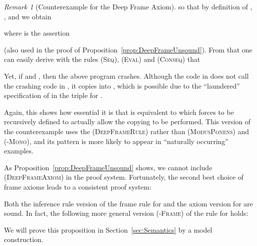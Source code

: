 \documentclass{LMCS}
\theoremstyle{remark}
\newtheorem{remark}[theorem]{Remark}
\begin{document}
\begin{remark}[Counterexample for the Deep Frame Axiom]
so that by definition of  , , and  we obtain

where  is the assertion 

(also used in the proof of Proposition~\ref{prop:DeepFrameUnsound}).
From that  one can easily derive with the rules  \textsc{(Seq)}, \textsc{(Eval)} and \textsc{(Conseq)}  that
  
Yet, if 
and , then the above program crashes. 
Although the code in  does not call the crashing code 
 in , it copies  
into , which is possible due to the ``laundered'' specification of  in the triple for . 


Again, this shows how essential it is that  is equivalent to  which forces  to be recursively defined to actually allow the copying to be performed. This version of the counterexample uses the (\textsc{DeepFrameRule}) rather than (\textsc{ModusPonens}) and (\textsc{-Mono}), and its pattern  is more likely to appear in ``naturally occurring'' examples.
 \end{remark}
 
As Proposition~\ref{prop:DeepFrameUnsound} shows, we cannot include (\textsc{DeepFrameAxiom}) in the proof system. 
Fortunately, 
the second best choice of frame axioms leads to a consistent proof system:
\begin{prop}
Both the inference rule version of the frame rule for  and the axiom version for 
are sound.
In fact, the  following more general version (\textsc{-Frame}) of the rule for  holds:

\end{prop}
We will prove this proposition in Section~\ref{sec:Semantics} by a model construction. 
\end{document}
